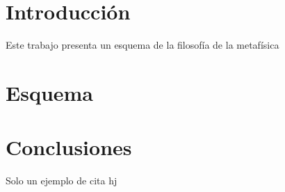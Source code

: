 \documentclass[12pt,twoside]{article}
\title{\titleName}
\author{\authorName}
\date{\today}
\begin{document}

\section{Introducción}
Este trabajo presenta un esquema de la filosofía de la metafísica
\section{Esquema}

\section{Conclusiones}

Solo un ejemplo de cita \autocite{Ciceron1967}
hj


\newpage
\printbibliography
\end{document}
